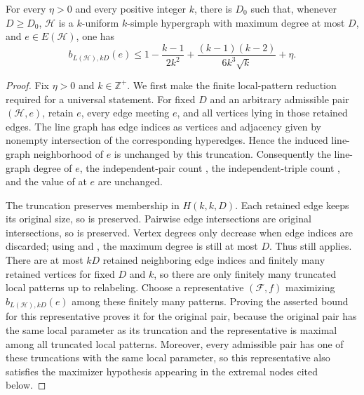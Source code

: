 \begin{lemma}
For every $\eta>0$ and every positive integer $k$, there is $D_0$ such that,
whenever $D\ge D_0$, $\mathcal H$ is a $k$-uniform $k$-simple hypergraph
with maximum degree at most $D$, and $e\in E(\mathcal H)$, one has
\[
b_{L(\mathcal H),kD}(e)
\le
1-\frac{k-1}{2k^2}
+\frac{(k-1)(k-2)}{6k^3\sqrt{k}}+\eta .
\]
\end{lemma}
\begin{proof}
Fix $\eta>0$ and $k\in\mathbb Z^+$.  We first make the finite local-pattern
reduction required for a universal statement.  For fixed $D$ and an
arbitrary admissible pair $(\mathcal H,e)$, retain $e$, every edge meeting
$e$, and all vertices lying in those retained edges.  The line graph
 has edge indices as vertices and adjacency
given by nonempty intersection of the corresponding hyperedges.  Hence the
induced line-graph neighborhood of $e$ is unchanged by this truncation.
Consequently the line-graph degree of $e$, the independent-pair count
, the independent-triple count
, and the value of
 at $e$ are unchanged.

The truncation preserves membership in $H(k,k,D)$.  Each retained edge keeps
its original size, so  is preserved.  Pairwise
edge intersections are original intersections, so 
is preserved.  Vertex degrees only decrease when edge indices are discarded;
using  and , the maximum
degree is still at most $D$.  Thus  still applies.
There are at most $kD$ retained neighboring edge indices and finitely many
retained vertices for fixed $D$ and $k$, so there are only finitely many
truncated local patterns up to relabeling.  Choose a representative
$(\mathcal F,f)$ maximizing $b_{L(\mathcal H),kD}(e)$ among these finitely
many patterns.  Proving the asserted bound for this representative proves it
for the original pair, because the original pair has the same local
parameter as its truncation and the representative is maximal among all
truncated local patterns.
Moreover, every admissible pair has one of these truncations with the same
local parameter, so this representative also satisfies the maximizer
hypothesis appearing in the extremal nodes cited below.


\end{proof}
